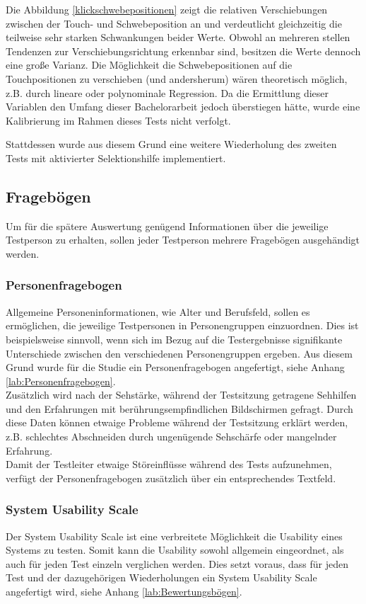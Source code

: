 \documentclass[a4paper,12pt,bibliography=totoc]{scrreprt}%
\begin{document}
Die Abbildung \ref{klickschwebepositionen} zeigt die relativen Verschiebungen zwischen der Touch- und Schwebeposition an und verdeutlicht gleichzeitig die teilweise sehr starken Schwankungen beider Werte. Obwohl an mehreren stellen Tendenzen zur Verschiebungsrichtung erkennbar sind, besitzen die Werte dennoch eine große Varianz. Die Möglichkeit die Schwebepositionen auf die Touchpositionen zu verschieben (und andersherum) wären theoretisch möglich, z.B. durch lineare oder polynominale Regression. Da die Ermittlung dieser Variablen den Umfang dieser Bachelorarbeit jedoch überstiegen hätte, wurde eine Kalibrierung im Rahmen dieses Tests nicht verfolgt.

Stattdessen wurde aus diesem Grund eine weitere Wiederholung des zweiten Tests mit aktivierter Selektionshilfe implementiert.

\subsection{Fragebögen}
Um für die spätere Auswertung genügend Informationen über die jeweilige Testperson zu erhalten, sollen jeder Testperson mehrere Fragebögen ausgehändigt werden.

\subsubsection{Personenfragebogen}
Allgemeine Personeninformationen, wie Alter und Berufsfeld, sollen es ermöglichen, die jeweilige Testpersonen in Personengruppen einzuordnen. Dies ist beispielsweise sinnvoll, wenn sich im Bezug auf die Testergebnisse signifikante Unterschiede zwischen den verschiedenen Personengruppen ergeben. Aus diesem Grund wurde für die Studie ein Personenfragebogen angefertigt, siehe Anhang \ref{lab:Personenfragebogen}.\\
Zusätzlich wird nach der Sehstärke, während der Testsitzung getragene Sehhilfen und den Erfahrungen mit berührungsempfindlichen Bildschirmen gefragt. Durch diese Daten können etwaige Probleme während der Testsitzung erklärt werden, z.B. schlechtes Abschneiden durch ungenügende Sehschärfe oder mangelnder Erfahrung.\\
Damit der Testleiter etwaige Störeinflüsse während des Tests aufzunehmen, verfügt der Personenfragebogen zusätzlich über ein entsprechendes Textfeld.

\subsubsection{System Usability Scale}
Der System Usability Scale ist eine verbreitete Möglichkeit die Usability eines Systems zu testen. Somit kann die Usability sowohl allgemein eingeordnet, als auch für jeden Test einzeln verglichen werden. Dies setzt voraus, dass für jeden Test und der dazugehörigen Wiederholungen ein System Usability Scale angefertigt wird, siehe Anhang \ref{lab:Bewertungsbögen}.
\end{document}
